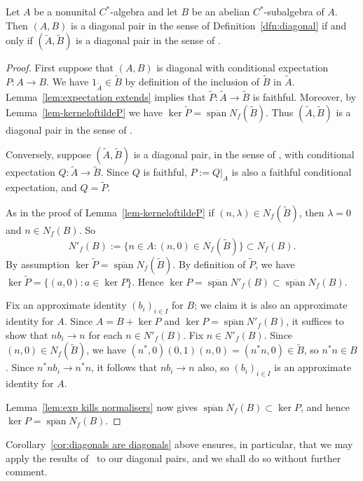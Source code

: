 \documentclass[12pt,a4paper]{amsart}
\newcommand{\lsp}{\operatorname{span}}
\newcommand{\clsp}{\overline{\lsp}}
\begin{document}
\begin{cor}\label{cor:diagonals are diagonals}
Let $A$ be a nonunital $C^*$-algebra and let $B$ be an abelian
$C^*$-subalgebra of $A$. Then $(A,B)$ is a diagonal pair in the
sense of Definition~\ref{dfn:diagonal} if and only if
$(\widetilde{A},\widetilde{B})$ is a diagonal pair in the sense
of \cite[Definition~1.1]{Kumjian1986}.
\end{cor}
\begin{proof}
First suppose that $(A,B)$ is diagonal with conditional
expectation $P : A \to B$. We have $1_{\widetilde A}\in
\widetilde B$ by definition of the inclusion of $\widetilde{B}$
in $\widetilde{A}$. Lemma~\ref{lem:expectation extends} implies
that $\widetilde{P} :\widetilde{A} \to \widetilde{B}$ is
faithful.  Moreover, by Lemma~\ref{lem-kerneloftildeP} we have
$\ker \widetilde{P} = \clsp N_f(\widetilde B)$. Thus
$(\widetilde A, \widetilde B)$ is a diagonal pair  in the sense
of \cite[Definition~1.1]{Kumjian1986}.

Conversely, suppose $(\widetilde{A}, \widetilde{B})$ is a
diagonal pair, in the sense of
\cite[Definition~1.1]{Kumjian1986}, with conditional expectation
$Q:\widetilde A\to\widetilde B$. Since $Q$ is faithful, $P :=
Q|_A$ is also a faithful conditional expectation, and $Q =
\widetilde{P}$.

As in the proof of Lemma~\ref{lem-kerneloftildeP} if $(n, \lambda) \in
N_f(\widetilde B)$, then $\lambda = 0$ and $n \in N_f(B)$. So
\[
    N'_f(B) := \{ n \in A : (n, 0) \in  N_f(\widetilde B) \} \subset N_f(B).
\]
By assumption $\ker \widetilde{P} = \clsp N_f(\widetilde B)$.
By definition of $\widetilde{P}$, we have $\ker \widetilde{P} =
\{ (a, 0) : a \in \ker P \}$. Hence $\ker P = \clsp
N'_f(B)\subset\clsp N_f(B)$.

Fix an approximate identity $(b_i)_{i \in I}$ for $B$; we claim
it is also an approximate identity for $A$. Since $A = B + \ker
P$ and $\ker P = \clsp N'_f(B)$, it suffices to show that $nb_i
\to n$ for each $n \in N'_f(B)$. Fix $n \in N'_f(B)$. Since
$(n, 0) \in N_f(\widetilde B)$, we have $(n^*, 0)(0, 1)(n, 0) =
(n^*n, 0) \in \widetilde B$, so $n^*n \in B$. Since $n^*nb_i
\to n^*n$, it follows that $nb_i \to n$ also, so $(b_i)_{i \in
I}$ is an approximate identity for $A$.

Lemma~\ref{lem:exp kills
normalisers} now gives  $\clsp
N_f(B)\subset \ker P$, and hence $\ker P=\clsp
N_f(B)$.
\end{proof}

Corollary~\ref{cor:diagonals are diagonals} above ensures, in
particular, that we may apply the results of~\cite{Kumjian1986}
to our diagonal pairs, and we shall do so without further
comment.
\end{document}
